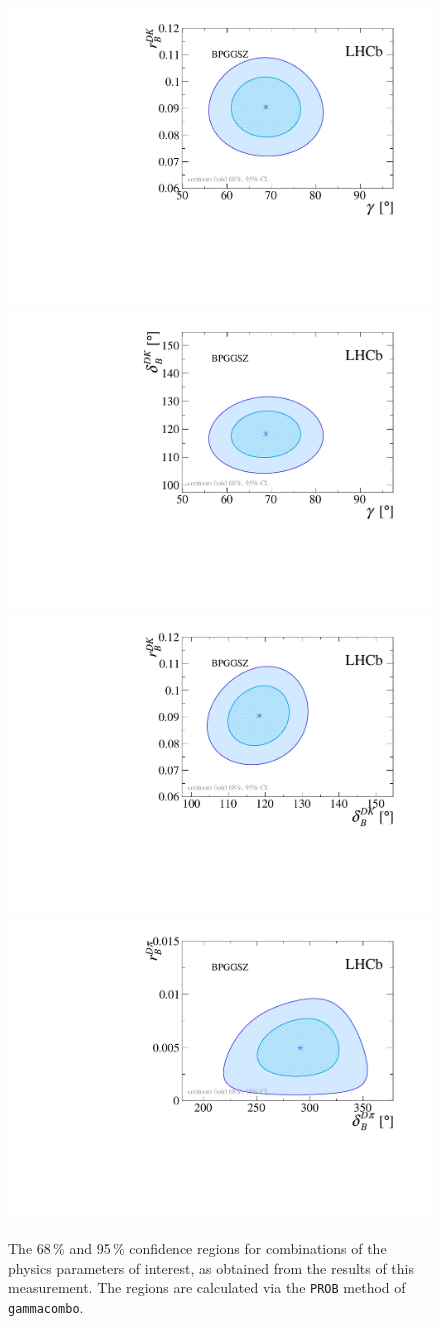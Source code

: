 \begin{figure}[tp]
    \centering
    \includegraphics[width=0.41\columnwidth]{figures/analysis/interpretation/2d_g_r_dk_prob.pdf}
    \includegraphics[width=0.41\columnwidth]{figures/analysis/interpretation/2d_g_d_dk_prob.pdf}
    \includegraphics[width=0.41\columnwidth]{figures/analysis/interpretation/2d_d_dk_r_dk_prob.pdf}
    \includegraphics[width=0.41\columnwidth]{figures/analysis/interpretation/2d_d_dpi_r_dpi_prob.pdf}
    \caption{The 68\,\% and 95\,\% confidence regions for combinations of the physics parameters of interest, as obtained from the results of this measurement. The regions are calculated via the \texttt{PROB} method of \texttt{gammacombo}.}
    \label{fig:2d_CL}
\end{figure}



